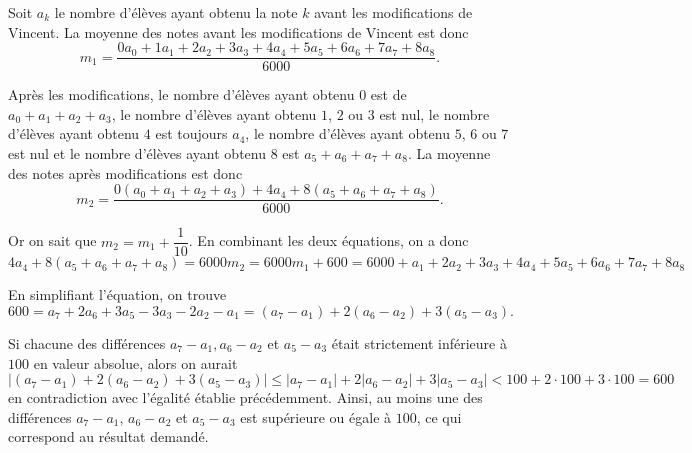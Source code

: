 Soit $a_k$ le nombre d'élèves ayant obtenu la note $k$ avant les modifications de Vincent. La moyenne des notes avant les modifications de Vincent est donc
$$m_1 = \frac{0a_0 + 1a_1 + 2a_2 + 3a_3 + 4a_4 + 5a_5 + 6a_6 + 7a_7 + 8a_8}{6000}.$$

Après les modifications, le nombre d'élèves ayant obtenu $0$ est de $a_0 + a_1 + a_2 + a_3$, le nombre d'élèves ayant obtenu $1$,
$2$ ou $3$ est nul, le nombre d'élèves ayant obtenu $4$ est toujours $a_4$, le nombre d'élèves ayant obtenu $5$, $6$ ou $7$ est nul et le nombre d'élèves ayant obtenu $8$ est $a_5 + a_6 + a_7 + a_8$. La moyenne des notes après modifications est donc
$$m_2 = \frac{0(a_0 + a_1 + a_2 + a_3) + 4a_4 + 8(a_5 + a_6 + a_7 + a_8)}{6000}.$$

Or on sait que $m_2 = m_1 + \dfrac{1}{10}$. En combinant les deux équations, on a donc
$$4a_4 + 8(a_5 + a_6 + a_7 + a_8) = 6000m_2 = 6000m_1 + 600 = 6000 + a_1 + 2a_2 + 3a_3 + 4a_4 + 5a_5 + 6a_6 + 7a_7 + 8a_8$$

En simplifiant l'équation, on trouve
$$600 = a_7 + 2a_6 + 3a_5 - 3a_3 - 2a_2 - a_1 = (a_7 - a_1) + 2(a_6 - a_2) + 3(a_5 - a_3).$$

Si chacune des différences $a_7 - a_1, a_6 - a_2$ et $a_5 - a_3$ était strictement inférieure à $100$ en valeur absolue, alors on aurait
$$|(a_7 - a_1) + 2(a_6 - a_2) + 3(a_5 - a_3)| \le |a_7 - a_1| + 2|a_6 - a_2| + 3|a_5 - a_3| < 100 + 2\cdot 100 + 3\cdot 100 = 600$$
en contradiction avec l'égalité établie précédemment.
Ainsi, au moins une des différences $a_7 - a_1$, $a_6 - a_2$ et $a_5 - a_3$ est supérieure ou égale à $100$, ce qui correspond au résultat demandé.